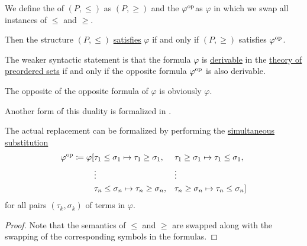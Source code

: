 \begin{theorem}\label{thm:preorder_duality}
  We define the  of \( (P, \leq) \) as \( (P, \geq) \) and the  \( \varphi^{\operatorname{op}} \)as \( \varphi \) in which we swap all instances of \( \leq \) and \( \geq \).

  Then the structure \( (P, \leq) \) \hyperref[def:first_order_model]{satisfies} \( \varphi \) if and only if \( (P, \geq) \) satisfies \( \varphi^{\operatorname{op}} \).
\end{theorem}
\begin{comments}
  \item The weaker syntactic statement is that the formula \( \varphi \) is \hyperref[def:proof_derivability]{derivable} in the \hyperref[def:preordered_set/theory]{theory of preordered sets} if and only if the opposite formula \( \varphi^{\operatorname{op}} \) is also derivable.

  \item The opposite of the opposite formula of \( \varphi \) is obviously \( \varphi \).

  \item Another form of this duality is formalized in .

  \item The actual replacement can be formalized by performing the \hyperref[def:first_order_substitution/term_in_formula]{simultaneous substitution}
  \begin{equation*}
    \begin{aligned}
      \varphi^{\operatorname{op}} \coloneqq \varphi[
        &\tau_1 \leq \sigma_1 \mapsto \tau_1 \geq \sigma_1, &&\tau_1 \geq \sigma_1 \mapsto \tau_1 \leq \sigma_1, \\
        &\vdots                                       &&\vdots \\
        &\tau_n \leq \sigma_n \mapsto \tau_n \geq \sigma_n, &&\tau_n \geq \sigma_n \mapsto \tau_n \leq \sigma_n]
    \end{aligned}
  \end{equation*}
  for all pairs \( (\tau_k, \sigma_k) \) of terms in \( \varphi \).
\end{comments}
\begin{proof}
  Note that the semantics of \( \leq \) and \( \geq \) are swapped along with the swapping of the corresponding symbols in the formulas.
\end{proof}

